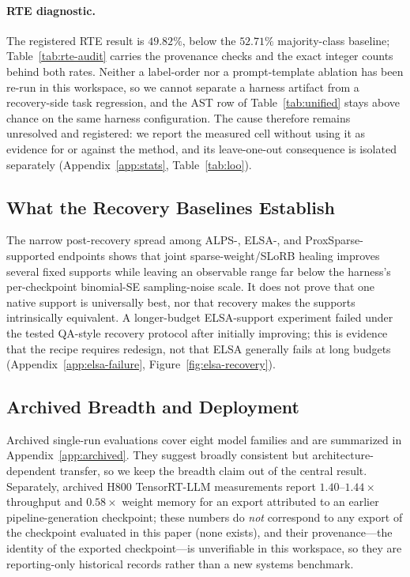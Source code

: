 \documentclass{article}
\begin{document}
\paragraph{RTE diagnostic.}
The registered RTE result is $49.82\%$, below the $52.71\%$ majority-class
baseline; Table~\ref{tab:rte-audit} carries the provenance checks and the exact
integer counts behind both rates. Neither a label-order nor a prompt-template
ablation has been re-run in this workspace, so we cannot separate a harness
artifact from a recovery-side task regression, and the AST row of
Table~\ref{tab:unified} stays above chance on the same harness configuration.
The cause therefore remains unresolved and registered: we report the measured
cell without using it as evidence for or against the method, and its
leave-one-out consequence is isolated separately
(Appendix~\ref{app:stats}, Table~\ref{tab:loo}).

\subsection{What the Recovery Baselines Establish}
The narrow post-recovery spread among ALPS-, ELSA-, and ProxSparse-supported endpoints shows that joint sparse-weight/SLoRB healing improves several fixed supports while leaving an observable range far below the harness's per-checkpoint binomial-SE sampling-noise scale. It does not prove that one native support is universally best, nor that recovery makes the supports intrinsically equivalent. A longer-budget ELSA-support experiment failed under the tested QA-style recovery protocol after initially improving; this is evidence that the recipe requires redesign, not that ELSA generally fails at long budgets (Appendix~\ref{app:elsa-failure}, Figure~\ref{fig:elsa-recovery}).

\subsection{Archived Breadth and Deployment}
Archived single-run evaluations cover eight model families and are summarized in Appendix~\ref{app:archived}. They suggest broadly consistent but architecture-dependent transfer, so we keep the breadth claim out of the central result. Separately, archived H800 TensorRT-LLM measurements report $1.40$--$1.44\times$ throughput and $0.58\times$ weight memory for an export attributed to an earlier pipeline-generation checkpoint; these numbers do \emph{not} correspond to any export of the checkpoint evaluated in this paper (none exists), and their provenance---the identity of the exported checkpoint---is unverifiable in this workspace, so they are reporting-only historical records rather than a new systems benchmark.
\end{document}

